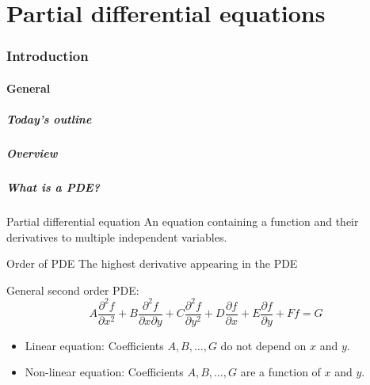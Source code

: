 \part{Partial differential equations}
\section{Introduction}
\subsection*{General}
\begin{frame}[label=contents_pde]
  \frametitle{Today's outline}
\end{frame}

\begin{frame}
  \frametitle{Overview}
\end{frame}

\begin{frame}
  \frametitle{What is a PDE?}
    \begin{block}{Partial differential equation}
      An equation containing a function and their derivatives to multiple independent variables.
    \end{block}
    \begin{block}{Order of PDE}
      The highest derivative appearing in the PDE
    \end{block}
    \pause
    General second order PDE:
    \[
      A \frac{\partial^2 f}{\partial x^2} + B\frac{\partial^2 f}{\partial x \partial y} + C\frac{\partial^2 f}{\partial y^2} + D\frac{\partial f}{\partial x} + E\frac{\partial f}{\partial y} +Ff = G
    \]
    \begin{itemize}
      \item Linear equation: Coefficients $A,B,\ldots,G$ do not depend on $x$ and $y$.
      \item Non-linear equation: Coefficients $A,B,\ldots,G$ are a function of $x$ and $y$.
    \end{itemize}
\end{frame}

